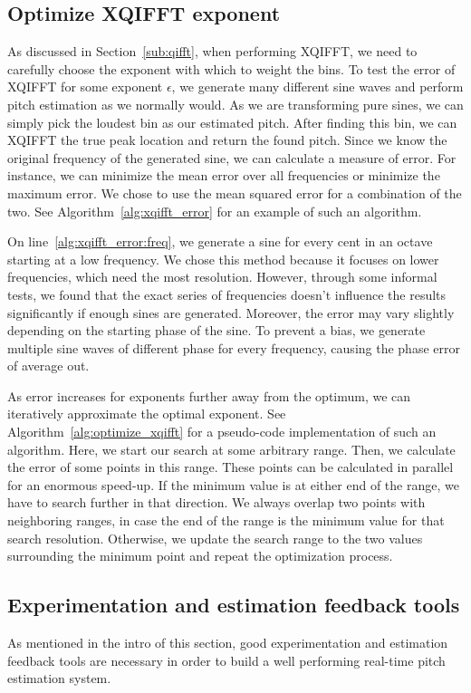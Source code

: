 \documentclass[a4paper,10pt,twocolumn]{article}
\begin{document}
\subsection{Optimize XQIFFT exponent}  \label{sub:opt_xqfft}
As discussed in Section~\ref{sub:qifft}, when performing XQIFFT, we need to carefully choose the exponent with which to weight the bins. To test the error of XQIFFT for some exponent $\epsilon$, we generate many different sine waves and perform pitch estimation as we normally would. As we are transforming pure sines, we can simply pick the loudest bin as our estimated pitch. After finding this bin, we can XQIFFT the true peak location and return the found pitch. Since we know the original frequency of the generated sine, we can calculate a measure of error. For instance, we can minimize the mean error over all frequencies or minimize the maximum error. We chose to use the mean squared error for a combination of the two. See Algorithm~\ref{alg:xqifft_error} for an example of such an algorithm.


On line~\ref{alg:xqifft_error:freq}, we generate a sine for every cent in an octave starting at a low frequency. We chose this method because it focuses on lower frequencies, which need the most resolution. However, through some informal tests, we found that the exact series of frequencies doesn't influence the results significantly if enough sines are generated. Moreover, the error may vary slightly depending on the starting phase of the sine. To prevent a bias, we generate multiple sine waves of different phase for every frequency, causing the phase error of average out.

As error increases for exponents further away from the optimum, we can iteratively approximate the optimal exponent. See Algorithm~\ref{alg:optimize_xqifft} for a pseudo-code implementation of such an algorithm. Here, we start our search at some arbitrary range. Then, we calculate the error of some points in this range. These points can be calculated in parallel for an enormous speed-up. If the minimum value is at either end of the range, we have to search further in that direction. We always overlap two points with neighboring ranges, in case the end of the range is the minimum value for that search resolution. Otherwise, we update the search range to the two values surrounding the minimum point and repeat the optimization process.



\subsection{Experimentation and estimation feedback tools}  \label{sub:tools}
As mentioned in the intro of this section, good experimentation and estimation feedback tools are necessary in order to build a well performing real-time pitch estimation system.
\end{document}
